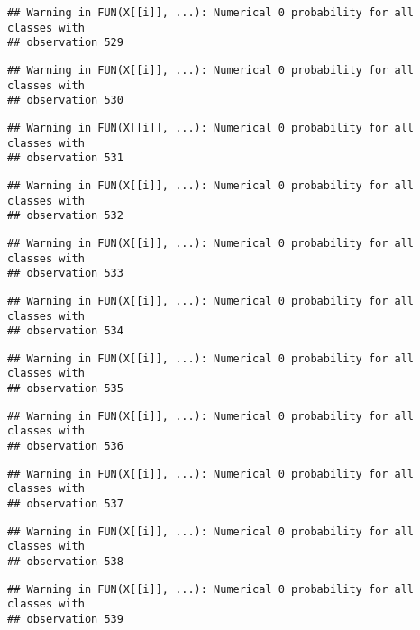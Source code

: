 \documentclass[
]{article}
\begin{document}
\begin{verbatim}
## Warning in FUN(X[[i]], ...): Numerical 0 probability for all classes with
## observation 529
\end{verbatim}

\begin{verbatim}
## Warning in FUN(X[[i]], ...): Numerical 0 probability for all classes with
## observation 530
\end{verbatim}

\begin{verbatim}
## Warning in FUN(X[[i]], ...): Numerical 0 probability for all classes with
## observation 531
\end{verbatim}

\begin{verbatim}
## Warning in FUN(X[[i]], ...): Numerical 0 probability for all classes with
## observation 532
\end{verbatim}

\begin{verbatim}
## Warning in FUN(X[[i]], ...): Numerical 0 probability for all classes with
## observation 533
\end{verbatim}

\begin{verbatim}
## Warning in FUN(X[[i]], ...): Numerical 0 probability for all classes with
## observation 534
\end{verbatim}

\begin{verbatim}
## Warning in FUN(X[[i]], ...): Numerical 0 probability for all classes with
## observation 535
\end{verbatim}

\begin{verbatim}
## Warning in FUN(X[[i]], ...): Numerical 0 probability for all classes with
## observation 536
\end{verbatim}

\begin{verbatim}
## Warning in FUN(X[[i]], ...): Numerical 0 probability for all classes with
## observation 537
\end{verbatim}

\begin{verbatim}
## Warning in FUN(X[[i]], ...): Numerical 0 probability for all classes with
## observation 538
\end{verbatim}

\begin{verbatim}
## Warning in FUN(X[[i]], ...): Numerical 0 probability for all classes with
## observation 539
\end{verbatim}
\end{document}
